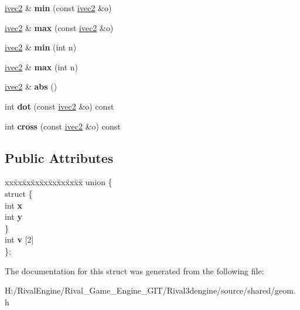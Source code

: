 \begin{DoxyCompactItemize}
\hyperlink{structivec2}{ivec2} \& {\bfseries min} (const \hyperlink{structivec2}{ivec2} \&o)
\item 
\mbox{\label{structivec2_a155a182e73cae4a9621e5cec17a17cbd}} 
\hyperlink{structivec2}{ivec2} \& {\bfseries max} (const \hyperlink{structivec2}{ivec2} \&o)
\item 
\mbox{\label{structivec2_ac761ea78367608662cf79f8ee1c255f2}} 
\hyperlink{structivec2}{ivec2} \& {\bfseries min} (int n)
\item 
\mbox{\label{structivec2_acd45419c0f882e882a5c1c80cd5986d6}} 
\hyperlink{structivec2}{ivec2} \& {\bfseries max} (int n)
\item 
\mbox{\label{structivec2_addc2881a6c752a54b083d11dcad6d7e6}} 
\hyperlink{structivec2}{ivec2} \& {\bfseries abs} ()
\item 
\mbox{\label{structivec2_ab53d042b3625c2fef465c5e2adeeeb2b}} 
int {\bfseries dot} (const \hyperlink{structivec2}{ivec2} \&o) const
\item 
\mbox{\label{structivec2_a83b2b8e9f457c8776e5ba7bd2f003ba0}} 
int {\bfseries cross} (const \hyperlink{structivec2}{ivec2} \&o) const
\end{DoxyCompactItemize}
\subsection*{Public Attributes}
\begin{DoxyCompactItemize}
\item 
\mbox{\label{structivec2_aca48e435b6c118daeb667fd5fe1b76e3}} 
\begin{tabbing}
xx\=xx\=xx\=xx\=xx\=xx\=xx\=xx\=xx\=\kill
union \{\\
\mbox{\label{unionivec2_1_1_0D191_a77e2deddf7feb1fc1500166fdde8fb08}} 
\>struct \{\\
\>\>int {\bfseries x}\\
\>\>int {\bfseries y}\\
\>\} \\
\>int {\bfseries v} \mbox{[}2\mbox{]}\\
\}; \\

\end{tabbing}\end{DoxyCompactItemize}


The documentation for this struct was generated from the following file\+:\begin{DoxyCompactItemize}
\item 
H\+:/\+Rival\+Engine/\+Rival\+\_\+\+Game\+\_\+\+Engine\+\_\+\+G\+I\+T/\+Rival3dengine/source/shared/geom.\+h\end{DoxyCompactItemize}
